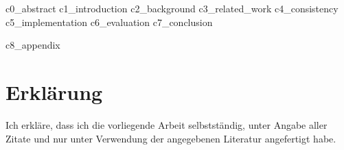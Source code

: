 \documentclass[ngerman, cdgeometry=twoside, open=right, notitlepage,BCOR=5mm]{tudscrreprt}
\begin{document}


\cleardoublepage

\tableofcontents

{c0_abstract}
{c1_introduction}
{c2_background}
{c3_related_work}
{c4_consistency}
{c5_implementation}
{c6_evaluation}
{c7_conclusion}

\printbibliography

{c8_appendix}

\chapter*{Erklärung}

Ich erkläre, dass ich die vorliegende Arbeit selbstständig, unter Angabe aller Zitate und nur unter Verwendung der angegebenen Literatur angefertigt habe.

\begin{figure}[H]
    \centering
\end{figure}

\cleardoublepage

\end{document}
